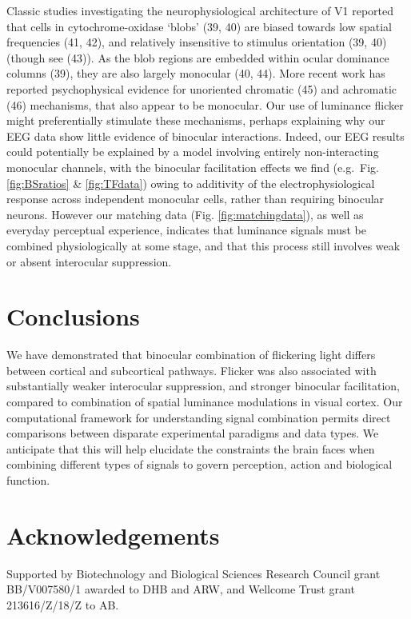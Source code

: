 \documentclass[
]{article}
\begin{document}
Classic studies investigating the neurophysiological architecture of V1 reported that cells in cytochrome-oxidase `blobs' (39, 40) are biased towards low spatial frequencies (41, 42), and relatively insensitive to stimulus orientation (39, 40) (though see (43)). As the blob regions are embedded within ocular dominance columns (39), they are also largely monocular (40, 44). More recent work has reported psychophysical evidence for unoriented chromatic (45) and achromatic (46) mechanisms, that also appear to be monocular. Our use of luminance flicker might preferentially stimulate these mechanisms, perhaps explaining why our EEG data show little evidence of binocular interactions. Indeed, our EEG results could potentially be explained by a model involving entirely non-interacting monocular channels, with the binocular facilitation effects we find (e.g.~Fig. \ref{fig:BSratios} \& \ref{fig:TFdata}) owing to additivity of the electrophysiological response across independent monocular cells, rather than requiring binocular neurons. However our matching data (Fig. \ref{fig:matchingdata}), as well as everyday perceptual experience, indicates that luminance signals must be combined physiologically at some stage, and that this process still involves weak or absent interocular suppression.

\hypertarget{conclusions}{%
\section{Conclusions}\label{conclusions}}

We have demonstrated that binocular combination of flickering light differs between cortical and subcortical pathways. Flicker was also associated with substantially weaker interocular suppression, and stronger binocular facilitation, compared to combination of spatial luminance modulations in visual cortex. Our computational framework for understanding signal combination permits direct comparisons between disparate experimental paradigms and data types. We anticipate that this will help elucidate the constraints the brain faces when combining different types of signals to govern perception, action and biological function.

\hypertarget{acknowledgements}{%
\section{Acknowledgements}\label{acknowledgements}}

Supported by Biotechnology and Biological Sciences Research Council grant BB/V007580/1 awarded to DHB and ARW, and Wellcome Trust grant 213616/Z/18/Z to AB.
\end{document}
